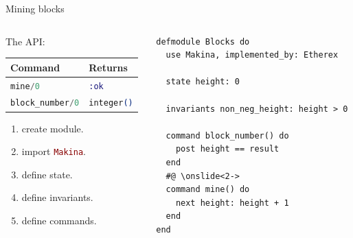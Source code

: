 \documentclass[aspectratio=169, 10pt, handout]{beamer}
\begin{document}
\begin{frame}[label={sec:orgab1f608},fragile]{Mining blocks}
 \begin{columns}
\begin{column}{0.48\columnwidth}
The API:

\begin{center}
\begin{tabular}{ll}
Command & Returns\\
\hline
\lstinline[language=elixir, style=display]~mine/0~ & \lstinline[language=elixir, style=display]~:ok~\\
\lstinline[language=elixir, style=display]~block_number/0~ & \lstinline[language=elixir, style=display]~integer()~\\
\end{tabular}
\end{center}

\vspace{10pt}
\begin{enumerate}
\item create module.
\item import \lstinline[language=elixir, style=display]~Makina~.
\item define state.
\item define invariants.
\item define commands.
\end{enumerate}
\end{column}

\begin{column}{0.48\columnwidth}
\lstset{language=elixir,label= ,caption= ,captionpos=b,numbers=none,style=display}
\begin{lstlisting}
defmodule Blocks do
  use Makina, implemented_by: Etherex

  state height: 0

  invariants non_neg_height: height > 0

  command block_number() do
    post height == result
  end
  #@ \onslide<2->
  command mine() do
    next height: height + 1
  end
end
\end{lstlisting}
\end{column}
\end{columns}
\end{frame}
\end{document}
